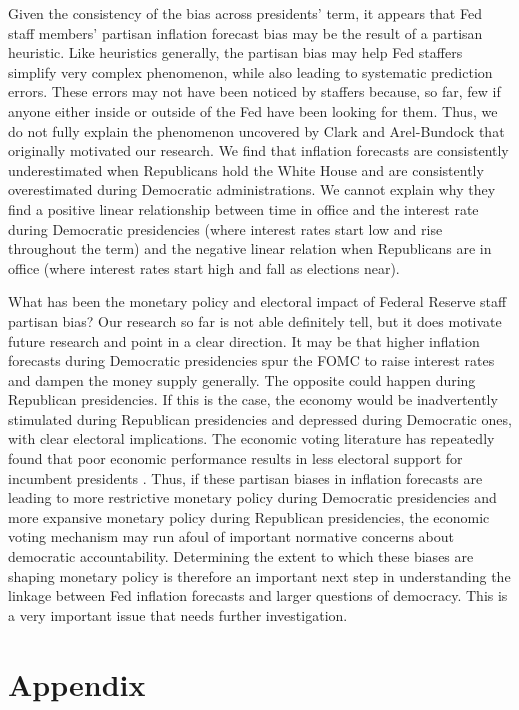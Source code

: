 \documentclass[a4paper]{article}\usepackage{graphicx, color}
\begin{document}
Given the consistency of the bias across presidents' term, it appears that Fed staff members' partisan inflation forecast bias may be the result of a partisan heuristic. Like heuristics generally, the partisan bias may help Fed staffers simplify very complex phenomenon, while also leading to systematic prediction errors. These errors may not have been noticed by staffers because, so far, few if anyone either inside or outside of the Fed have been looking for them. Thus, we do not fully explain the phenomenon uncovered by Clark and Arel-Bundock that originally motivated our research. We find that inflation forecasts are consistently underestimated when Republicans hold the White House and are consistently overestimated during Democratic administrations. We cannot explain why they find a positive linear relationship between time in office and the interest rate during Democratic presidencies (where interest rates start low and rise throughout the term) and the negative linear relation when Republicans are in office (where interest rates start high and fall as elections near).

What has been the monetary policy and electoral impact of Federal Reserve staff partisan bias? Our research so far is not able definitely tell, but it does motivate future research and point in a clear direction. It may be that higher inflation forecasts during Democratic presidencies spur the FOMC to raise interest rates and dampen the money supply generally. The opposite could happen during Republican presidencies. If this is the case, the economy would be inadvertently stimulated during Republican presidencies and depressed during Democratic ones, with clear electoral implications. The economic voting literature has repeatedly found that poor economic performance results in less electoral support for incumbent presidents \citep[e.g.][]{Alvarez1998, Bloom1975, LewisBeck1988, Powell1993}. Thus, if these partisan biases in inflation forecasts are leading to more restrictive monetary policy during Democratic presidencies and more expansive monetary policy during Republican presidencies, the economic voting mechanism may run afoul of important normative concerns about democratic accountability. Determining the extent to which these biases are shaping monetary policy is therefore an important next step in understanding the linkage between Fed inflation forecasts and larger questions of democracy. This is a very important issue that needs further investigation.

\clearpage
\section*{Appendix}
\end{document}
